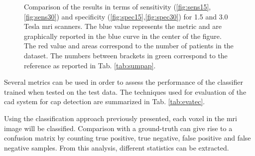 \begin{figure}
{
}
\hspace*{\fill}
\caption{Comparison of the results in terms of sensitivity (\ref{fig:sens15},\ref{fig:sens30}) and specificity (\ref{fig:spec15},\ref{fig:spec30}) for 1.5 and 3.0 Tesla \ac{mri} scanners. The {\color{blue}blue} value represents the metric and are graphically reported in the blue curve in the center of the figure. The {\color{red}red} value and areas correspond to the number of patients in the dataset. The numbers between brackets in {\color{semiAuto}green} correspond to the reference as reported in Tab. \ref{tab:sumpap}.}
\label{fig:sensspec}
\end{figure}

Several metrics can be used in order to assess the performance of the classifier trained when tested on the test data. The techniques used for evaluation of the \ac{cad} system for \ac{cap} detection are summarized in Tab. \ref{tab:evatec}.

Using the classification approach previously presented, each voxel in the \ac{mri} image will be classified. Comparison with a ground-truth can give rise to a confusion matrix by counting true positive, true negative, false positive and false negative samples. From this analysis, different statistics can be extracted. 

